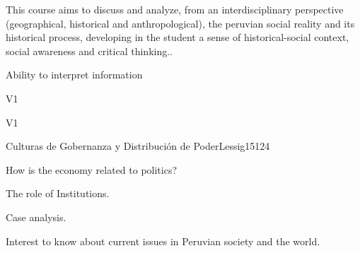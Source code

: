 \begin{syllabus}


\begin{justification}
This course aims to discuss and analyze, from an interdisciplinary perspective (geographical, historical and anthropological), the peruvian social reality and its historical process, developing in the student a sense of historical-social context, social awareness and critical thinking.. 
\end{justification}

\begin{goals}
\item Ability to interpret information
\end{goals}

\begin{outcomes}{V1}
    \item {}
    \item {}
    \item {}
    
\end{outcomes}

\begin{competences}{V1}
    \item {}
    \item {}
    \item {}
    \item {}
\end{competences}

\begin{unit}{Culturas de Gobernanza y Distribución de Poder}{}{Lessig15}{12}{4}
   \begin{topics}
      \item How is the economy related to politics?
      \item The role of Institutions.
      \item Case analysis.
   \end{topics}
   \begin{learningoutcomes}
      \item Interest to know about current issues in Peruvian society and the world.
   \end{learningoutcomes}
\end{unit}

\begin{coursebibliography}
\end{coursebibliography}

\end{syllabus}
